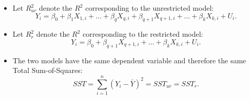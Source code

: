 \documentclass[notes=show,compress,beamer]{beamer}
\begin{document}
\begin{frame}%


\begin{itemize}
\item Let $R_{ur}^{2}$ denote the $R^{2}$ corresponding to the unrestricted
model:%
\begin{equation*}
Y_{i}=\beta _{0}+\beta _{1}X_{1,i}+\ldots +\beta _{q}X_{q,i}+\beta
_{q+1}X_{q+1,i}+\ldots +\beta _{k}X_{k,i}+U_{i}.
\end{equation*}%
\pause%

\item Let $R_{r}^{2}$ denote the $R^{2}$ corresponding to the restricted
model:%
\begin{equation*}
Y_{i}=\beta _{0}+\beta _{q+1}X_{q+1,i}+\ldots +\beta _{k}X_{k,i}+U_{i}.
\end{equation*}%
\pause%

\item The two models have the same dependent variable and therefore the same
Total Sum-of-Squares:%
\begin{equation*}
SST=\sum_{i=1}^{n}\left( Y_{i}-\bar{Y}\right) ^{2}=SST_{ur}=SST_{r}.
\end{equation*}
\end{itemize}

\end{frame}%
\end{document}
